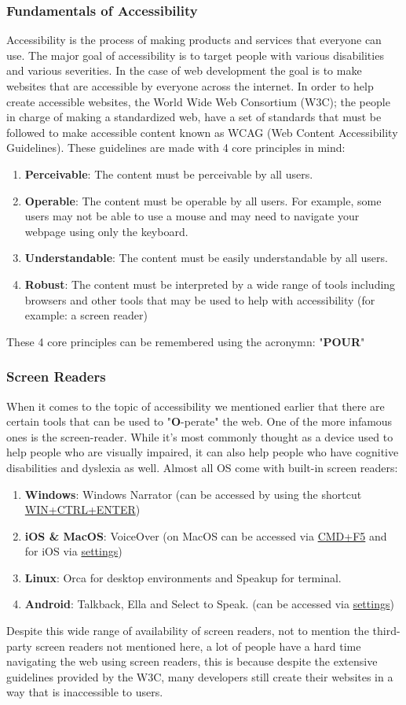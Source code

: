 \documentclass[11pt]{article}
\begin{document}
\subsubsection{Fundamentals of Accessibility}
\label{sec:org82671c9}
Accessibility is the process of making products and services that everyone can use. The major goal
of accessibility is to target people with various disabilities and various severities. In the case
of web development the goal is to make websites that are accessible by everyone across the internet.
In order to help create accessible websites, the World Wide Web Consortium (W3C); the people in
charge of making a standardized web, have a set of standards that must be followed to make
accessible content known as WCAG (Web Content Accessibility Guidelines). These guidelines are made
with 4 core principles in mind:
\begin{enumerate}
\item \textbf{Perceivable}: The content must be perceivable by all users.
\item \textbf{Operable}: The content must be operable by all users.
For example, some users may not be able to use a mouse and may need to navigate your webpage
using only the keyboard.
\item \textbf{Understandable}: The content must be easily understandable by all users.
\item \textbf{Robust}: The content must be interpreted by a wide range of tools including browsers and other
tools that may be used to help with accessibility (for example: a screen reader)
\end{enumerate}
These 4 core principles can be remembered using the acronymn: "\textbf{POUR}"
\subsubsection{Screen Readers}
\label{sec:orgb61944b}
When it comes to the topic of accessibility we mentioned earlier that there are certain tools that
can be used to "\textbf{O}-perate" the web. One of the more infamous ones is the screen-reader. While it's
most commonly thought as a device used to help people who are visually impaired, it can also help
people who have cognitive disabilities and dyslexia as well. Almost all OS come with built-in screen
readers:
\begin{enumerate}
\item \textbf{Windows}: Windows Narrator (can be accessed by using the shortcut \uline{WIN+CTRL+ENTER})
\item \textbf{iOS \& MacOS}: VoiceOver (on MacOS can be accessed via \uline{CMD+F5} and for iOS via \uline{settings})
\item \textbf{Linux}: Orca for desktop environments and Speakup for terminal.
\item \textbf{Android}: Talkback, Ella and Select to Speak. (can be accessed via \uline{settings})
\end{enumerate}
Despite this wide range of availability of screen readers, not to mention the third-party screen
readers not mentioned here, a lot of people have a hard time navigating the web using screen
readers, this is because despite the extensive guidelines provided by the W3C, many developers still
create their websites in a way that is inaccessible to users.
\end{document}
